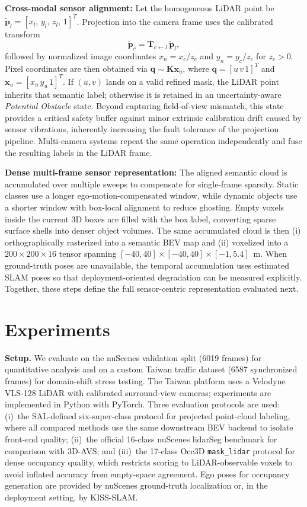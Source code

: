 \documentclass{IEEE_lsens/IEEE_lsens}
\begin{document}
\textbf{Cross-modal sensor alignment:} Let the homogeneous LiDAR point be $\tilde{\mathbf{p}}_{l}=[x_l,\,y_l,\,z_l,\,1]^T$. Projection into the camera frame uses the calibrated transform
\begin{equation}
\tilde{\mathbf{p}}_{c}=\mathbf{T}_{c\leftarrow l}\,\tilde{\mathbf{p}}_{l},
\label{eq:extrinsic}
\end{equation}
followed by normalized image coordinates $x_n=x_c/z_c$ and $y_n=y_c/z_c$ for $z_c>0$. Pixel coordinates are then obtained via $\mathbf{q}\sim\mathbf{K}\mathbf{x}_u$, where $\mathbf{q}=[u\,v\,1]^T$ and $\mathbf{x}_u=[x_u\,y_u\,1]^T$. If $(u,v)$ lands on a valid refined mask, the LiDAR point inherits that semantic label; otherwise it is retained in an uncertainty-aware \emph{Potential Obstacle} state. Beyond capturing field-of-view mismatch, this state provides a critical safety buffer against minor extrinsic calibration drift caused by sensor vibrations, inherently increasing the fault tolerance of the projection pipeline. Multi-camera systems repeat the same operation independently and fuse the resulting labels in the LiDAR frame.

\textbf{Dense multi-frame sensor representation:} The aligned semantic cloud is accumulated over multiple sweeps to compensate for single-frame sparsity. Static classes use a longer ego-motion-compensated window, while dynamic objects use a shorter window with box-local alignment to reduce ghosting. Empty voxels inside the current 3D boxes are filled with the box label, converting sparse surface shells into denser object volumes. The same accumulated cloud is then (i) orthographically rasterized into a semantic BEV map and (ii) voxelized into a $200\times200\times16$ tensor spanning $[-40,40]\times[-40,40]\times[-1,5.4]$~m. When ground-truth poses are unavailable, the temporal accumulation uses estimated SLAM poses so that deployment-oriented degradation can be measured explicitly. Together, these steps define the full sensor-centric representation evaluated next.

\section{Experiments}
\textbf{Setup.} We evaluate on the nuScenes validation split (6019 frames) for quantitative analysis and on a custom Taiwan traffic dataset (6587 synchronized frames) for domain-shift stress testing. The Taiwan platform uses a Velodyne VLS-128 LiDAR with calibrated surround-view cameras; experiments are implemented in Python with PyTorch. Three evaluation protocols are used: (i)~the SAL-defined six-super-class protocol for projected point-cloud labeling, where all compared methods use the same downstream BEV backend to isolate front-end quality; (ii)~the official 16-class nuScenes lidarSeg benchmark for comparison with 3D-AVS; and (iii)~the 17-class Occ3D \texttt{mask\_lidar} protocol for dense occupancy quality, which restricts scoring to LiDAR-observable voxels to avoid inflated accuracy from empty-space agreement. Ego poses for occupancy generation are provided by nuScenes ground-truth localization or, in the deployment setting, by KISS-SLAM.
\end{document}
